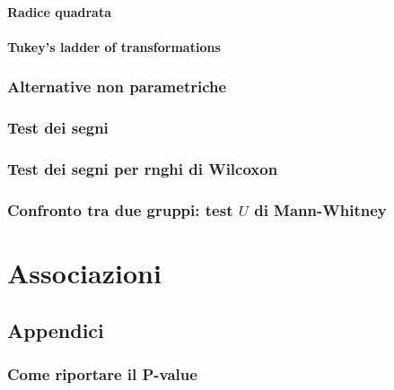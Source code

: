 \documentclass[10pt, draft]{book}
\newcounter{example}[section]
\begin{document}
\subsection{Radice quadrata}

\subsection{Tukey's ladder of transformations}

\section{Alternative non parametriche}

\section{Test dei segni}

\section{Test dei segni per rnghi di Wilcoxon}

\section{Confronto tra due gruppi: test \texorpdfstring{$U$}{Lg} di Mann-Whitney}
\begin{example}\label{esgrilli}
    
\end{example}

\part{Associazioni}

\chapter{}

\section{}

\chapter{Appendici}

\section{Come riportare il P-value}
\end{document}
